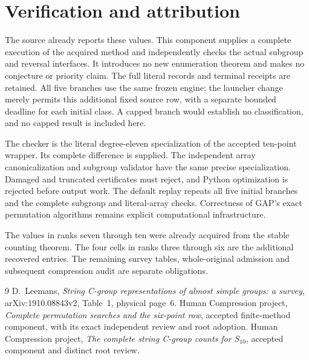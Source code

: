 \documentclass[10pt,a4paper]{article}
\begin{document}
\section*{Verification and attribution}
The source already reports these values.  This component supplies a
complete execution of the acquired method and independently checks
the actual subgroup and reversal interfaces.  It introduces no new
enumeration theorem and makes no conjecture or priority claim.
The full literal records and terminal receipts are retained.  All
five branches use the same frozen engine; the launcher change merely
permits this additional fixed source row, with a separate bounded
deadline for each initial class.  A capped branch would establish
no classification, and no capped result is included here.

The checker is the literal degree-eleven specialization of the accepted
ten-point wrapper.  Its complete difference is supplied.  The
independent array canonicalization and subgroup validator have the
same precise specialization.  Damaged and truncated certificates
must reject, and Python optimization is rejected before output work.
The default replay repeats all five initial branches and the complete
subgroup and literal-array checks.  Correctness of GAP's exact
permutation algorithms remains explicit computational infrastructure.

The values in ranks seven through ten were already acquired from
the stable counting theorem.  The four cells in ranks three through
six are the additional recovered entries.  The remaining survey
tables, whole-original admission and subsequent compression audit
are separate obligations.

\begin{thebibliography}{9}\small
{} D.~Leemans, \emph{String C-group representations of almost
simple groups: a survey}, arXiv:1910.08843v2, Table~1, physical page~6.
 Human Compression project, \emph{Complete permutation
searches and the six-point row}, accepted finite-method component,
with its exact independent review and root adoption.
 Human Compression project, \emph{The complete string
C-group counts for $S_{10}$}, accepted component and distinct root review.
\end{thebibliography}
\end{document}
